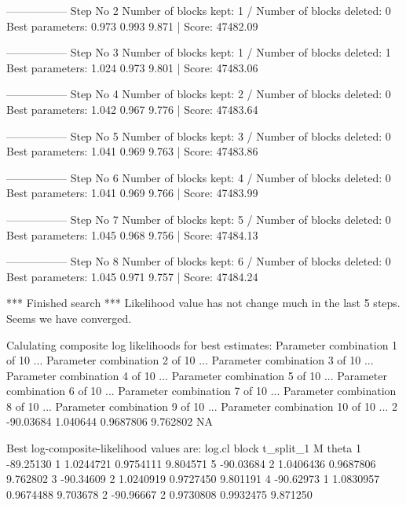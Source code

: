 \begin{Schunk}
\begin{Soutput}
----------------- 
Step No 2 
Number of blocks kept: 1  / Number of blocks deleted: 0 
Best parameters:  0.973 0.993 9.871 | Score: 47482.09 

----------------- 
Step No 3 
Number of blocks kept: 1  / Number of blocks deleted: 1 
Best parameters:  1.024 0.973 9.801 | Score: 47483.06 

----------------- 
Step No 4 
Number of blocks kept: 2  / Number of blocks deleted: 0 
Best parameters:  1.042 0.967 9.776 | Score: 47483.64 

----------------- 
Step No 5 
Number of blocks kept: 3  / Number of blocks deleted: 0 
Best parameters:  1.041 0.969 9.763 | Score: 47483.86 

----------------- 
Step No 6 
Number of blocks kept: 4  / Number of blocks deleted: 0 
Best parameters:  1.041 0.969 9.766 | Score: 47483.99 

----------------- 
Step No 7 
Number of blocks kept: 5  / Number of blocks deleted: 0 
Best parameters:  1.045 0.968 9.756 | Score: 47484.13 

----------------- 
Step No 8 
Number of blocks kept: 6  / Number of blocks deleted: 0 
Best parameters:  1.045 0.971 9.757 | Score: 47484.24 

*** Finished search *** 
Likelihood value has not change much in the last 5 steps. 
Seems we have converged. 

Calulating composite log likelihoods for best estimates: 
Parameter combination 1 of 10 ... 
Parameter combination 2 of 10 ... 
Parameter combination 3 of 10 ... 
Parameter combination 4 of 10 ... 
Parameter combination 5 of 10 ... 
Parameter combination 6 of 10 ... 
Parameter combination 7 of 10 ... 
Parameter combination 8 of 10 ... 
Parameter combination 9 of 10 ... 
Parameter combination 10 of 10 ... 
2	-90.03684	1.040644	0.9687806	9.762802	NA	

Best log-composite-likelihood values are: 
     log.cl block t_split_1         M    theta
1 -89.25130     1 1.0244721 0.9754111 9.804571
5 -90.03684     2 1.0406436 0.9687806 9.762802
3 -90.34609     2 1.0240919 0.9727450 9.801191
4 -90.62973     1 1.0830957 0.9674488 9.703678
2 -90.96667     2 0.9730808 0.9932475 9.871250
\end{Soutput}
\end{Schunk}

